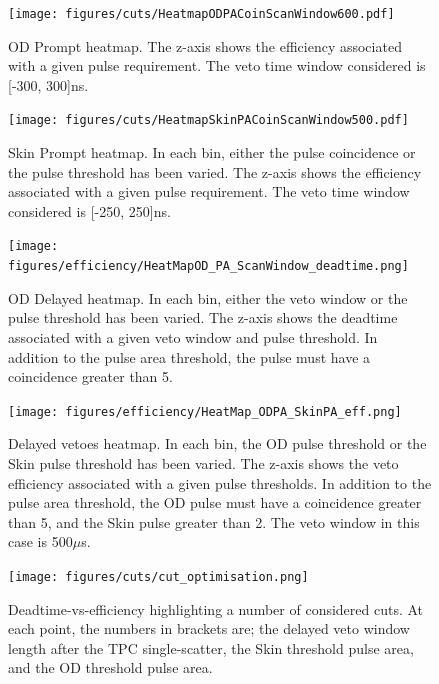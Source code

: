 \begin{figure}
     \centering
     \texttt{[image: figures/cuts/HeatmapODPACoinScanWindow600.pdf]}
     \caption{OD Prompt heatmap. 
     The z-axis shows the efficiency associated with a given pulse requirement.
     The veto time window considered is [-300, 300]ns.
     }
     \label{fig:od_prompt_veto_heatmap}
\end{figure}  
\begin{figure}
     \centering
     \texttt{[image: figures/cuts/HeatmapSkinPACoinScanWindow500.pdf]}
     \caption{Skin Prompt heatmap.
     In each bin, either the pulse coincidence or the pulse threshold has been varied.
     The z-axis shows the efficiency associated with a given pulse requirement.
     The veto time window considered is [-250, 250]ns.}
     \label{fig:skin_prompt_veto_heatmap}
\end{figure}
\begin{figure}
 \centering
 \texttt{[image: figures/efficiency/HeatMapOD\_PA\_ScanWindow\_deadtime.png]}
 \caption{OD Delayed heatmap.
 In each bin, either the veto window or the pulse threshold has been varied.
 The z-axis shows the deadtime associated with a given veto window and pulse threshold.
 In addition to the pulse area threshold, the pulse must have a coincidence greater than 5.}
 \label{fig:od_delayed_veto_heatmap}
\end{figure}
\begin{figure}{\textwidth}
 \centering
 \texttt{[image: figures/efficiency/HeatMap\_ODPA\_SkinPA\_eff.png]}
 \caption{Delayed vetoes heatmap.
 In each bin, the OD pulse threshold or the Skin pulse threshold has been varied.
 The z-axis shows the veto efficiency associated with a given pulse thresholds.
 In addition to the pulse area threshold, the OD pulse must have a coincidence greater than 5, and the Skin pulse greater than 2.
 The veto window in this case is 500$\mu$s.}
 \label{fig:skin_delayed_veto_heatmap}
\end{figure}

\begin{figure}
    \centering
    \texttt{[image: figures/cuts/cut\_optimisation.png]}
    \caption{Deadtime-vs-efficiency highlighting a number of considered cuts.
    At each point, the numbers in brackets are; the delayed veto window length after the TPC single-scatter, the Skin threshold pulse area, and the OD threshold pulse area.}
    \label{fig:veto_cut_optimisation}
\end{figure}

